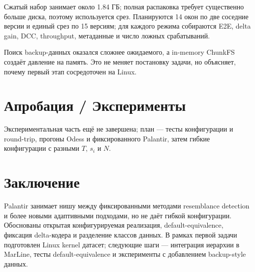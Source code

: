 \documentclass[a4paper]{article}
\begin{document}
Сжатый набор занимает около 1.84 ГБ; полная распаковка требует существенно больше диска, поэтому используется срез. Планируются 14 окон по две соседние версии и единый срез по 15 версиям; для каждого режима собираются E2E, delta gain, DCC, throughput, метаданные и число ложных срабатываний.

Поиск backup-данных оказался сложнее ожидаемого, а in-memory ChunkFS создаёт давление на память. Это не меняет постановку задачи, но объясняет, почему первый этап сосредоточен на Linux.

\section{Апробация / Эксперименты}

Экспериментальная часть ещё не завершена; план --- тесты конфигурации и round-trip, прогоны Odess и фиксированного Palantir, затем гибкие конфигурации с разными $T$, $s_i$ и $N$.

\section{Заключение}

Palantir занимает нишу между фиксированными методами resemblance detection и более новыми адаптивными подходами, но не даёт гибкой конфигурации. Обоснованы открытая конфигурируемая реализация, default-equivalence, фиксация delta-кодера и разделение классов данных. В рамках первой задачи подготовлен Linux kernel датасет; следующие шаги --- интеграция иерархии в MarLine, тесты default-equivalence и эксперименты с добавлением backup-style данных.
\end{document}
